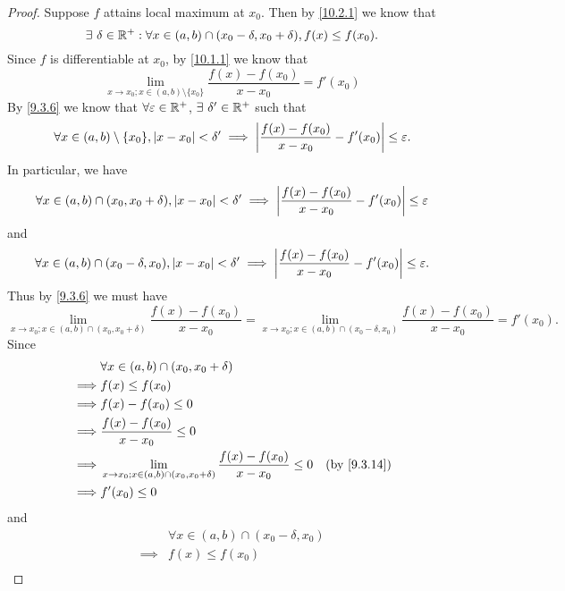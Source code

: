 \begin{proof}
  Suppose \(f\) attains local maximum at \(x_0\).
  Then by \cref{10.2.1} we know that
  \[
    \exists\ \delta \in \mathbb{R}^+ : \forall x \in (a, b) \cap (x_0 - \delta, x_0 + \delta), f(x) \leq f(x_0).
  \]
  Since \(f\) is differentiable at \(x_0\), by \cref{10.1.1} we know that
  \[
    \lim_{x \to x_0 ; x \in (a, b) \setminus \{x_0\}} \frac{f(x) - f(x_0)}{x - x_0} = f'(x_0)
  \]
  By \cref{9.3.6} we know that \(\forall \varepsilon \in \mathbb{R}^+\), \(\exists\ \delta' \in \mathbb{R}^+\) such that
  \[
    \forall x \in (a, b) \setminus \{x_0\}, \left\lvert x - x_0\right\rvert < \delta' \implies \left\lvert\frac{f(x) - f(x_0)}{x - x_0} - f'(x_0)\right\rvert \leq \varepsilon.
  \]
  In particular, we have
  \[
    \forall x \in (a, b) \cap (x_0, x_0 + \delta), \left\lvert x - x_0\right\rvert < \delta' \implies \left\lvert\frac{f(x) - f(x_0)}{x - x_0} - f'(x_0)\right\rvert \leq \varepsilon
  \]
  and
  \[
    \forall x \in (a, b) \cap (x_0 - \delta, x_0), \left\lvert x - x_0\right\rvert < \delta' \implies \left\lvert\frac{f(x) - f(x_0)}{x - x_0} - f'(x_0)\right\rvert \leq \varepsilon.
  \]
  Thus by \cref{9.3.6} we must have
  \[
    \lim_{x \to x_0 ; x \in (a, b) \cap (x_0, x_0 + \delta)} \frac{f(x) - f(x_0)}{x - x_0} = \lim_{x \to x_0 ; x \in (a, b) \cap (x_0 - \delta, x_0)} \frac{f(x) - f(x_0)}{x - x_0} = f'(x_0).
  \]
  Since
  \begin{align*}
             & \forall x \in (a, b) \cap (x_0, x_0 + \delta)                                                                             \\
    \implies & f(x) \leq f(x_0)                                                                                                          \\
    \implies & f(x) - f(x_0) \leq 0                                                                                                      \\
    \implies & \frac{f(x) - f(x_0)}{x - x_0} \leq 0                                                                                      \\
    \implies & \lim_{x \to x_0 ; x \in (a, b) \cap (x_0, x_0 + \delta)} \frac{f(x) - f(x_0)}{x - x_0} \leq 0 & \text{(by \cref{9.3.14})} \\
    \implies & f'(x_0) \leq 0
  \end{align*}
  and
  \begin{align*}
             & \forall x \in (a, b) \cap (x_0 - \delta, x_0)                                                                              \\
    \implies & f(x) \leq f(x_0)                                                                                                           \\

\end{align*}
\end{proof}
